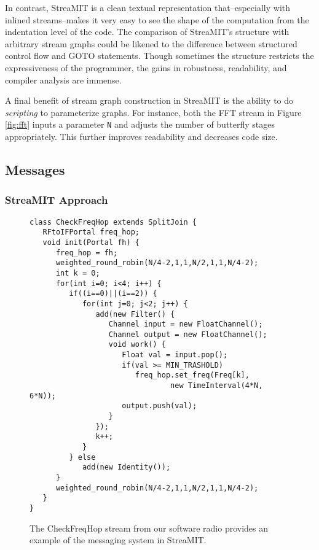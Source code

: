 In contrast, StreaMIT is a clean textual representation
that--especially with inlined streams--makes it very easy to see the
shape of the computation from the indentation level of the code.  The
comparison of StreaMIT's structure with arbitrary stream graphs could
be likened to the difference between structured control flow and GOTO
statements.  Though sometimes the structure restricts the
expressiveness of the programmer, the gains in robustness,
readability, and compiler analysis are immense.

A final benefit of stream graph construction in StreaMIT is the
ability to do {\it scripting} to parameterize graphs.  For instance,
both the FFT stream in Figure \ref{fig:fft} inputs a parameter {\tt N}
and adjusts the number of butterfly stages appropriately.  This
further improves readability and decreases code size.

\subsection{Messages}

\subsubsection{StreaMIT Approach}

\begin{figure}
\scriptsize
\begin{verbatim}
class CheckFreqHop extends SplitJoin {
   RFtoIFPortal freq_hop;
   void init(Portal fh) {
      freq_hop = fh;
      weighted_round_robin(N/4-2,1,1,N/2,1,1,N/4-2);
      int k = 0;
      for(int i=0; i<4; i++) {
         if((i==0)||(i==2)) {
            for(int j=0; j<2; j++) {
               add(new Filter() {
                  Channel input = new FloatChannel();
                  Channel output = new FloatChannel();
                  void work() {
                     Float val = input.pop();
                     if(val >= MIN_TRASHOLD) 
                        freq_hop.set_freq(Freq[k], 
                                new TimeInterval(4*N, 6*N)); 
                     output.push(val);
                  }
               });
               k++;
            }
         } else
            add(new Identity());
      }
      weighted_round_robin(N/4-2,1,1,N/2,1,1,N/4-2);
   }
}
\end{verbatim}
\vspace{-12pt}
\caption{\protect\small The CheckFreqHop stream from our software
   radio provides an example of the messaging system in StreaMIT.
\protect\label{fig:mess}}
\vspace{-12pt}
\end{figure}

